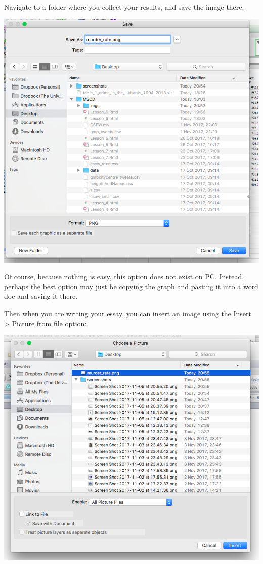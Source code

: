 \documentclass[]{book}
\theoremstyle{definition}
\theoremstyle{definition}
\theoremstyle{definition}
\theoremstyle{remark}
\begin{document}
Navigate to a folder where you collect your results, and save the image
there.

\includegraphics{imgs/save_pic_2.png}

Of course, because nothing is easy, this option does not exist on PC.
Instead, perhaps the best option may just be copying the graph and
pasting it into a word doc and saving it there.

Then when you are writing your essay, you can insert an image using the
Insert \textgreater{} Picture from file option:

\includegraphics{imgs/find_pic.png}
\end{document}
